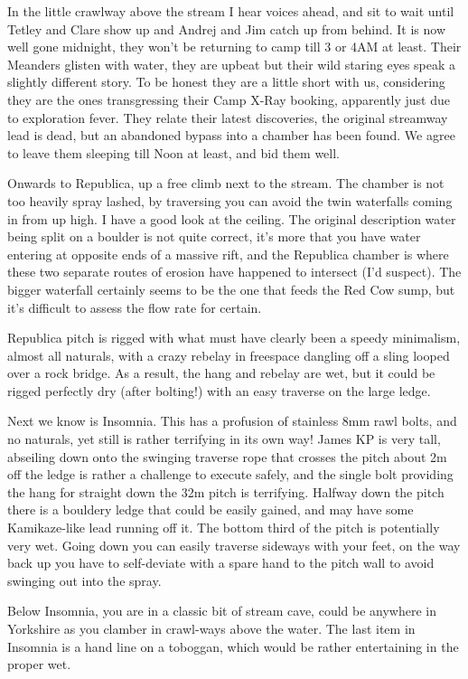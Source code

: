 In the little crawlway above the stream I hear voices ahead, and sit to
wait until Tetley and Clare show up and Andrej and Jim catch up from
behind. It is now well gone midnight, they won't be returning to camp
till 3 or 4AM at least. Their Meanders glisten with water, they are
upbeat but their wild staring eyes speak a slightly different story. To
be honest they are a little short with us, considering they are the ones
transgressing their Camp X-Ray booking, apparently just due to
exploration fever. They relate their latest discoveries, the original
streamway lead is dead, but an abandoned bypass into a chamber has been
found. We agree to leave them sleeping till Noon at least, and bid them
well.

Onwards to Republica, up a free climb next to the stream. The chamber is
not too heavily spray lashed, by traversing you can avoid the twin
waterfalls coming in from up high. I have a good look at the ceiling.
The original description water being split on a boulder is not quite
correct, it's more that you have water entering at opposite ends of a
massive rift, and the Republica chamber is where these two separate
routes of erosion have happened to intersect (I'd suspect). The bigger
waterfall certainly seems to be the one that feeds the Red Cow sump, but
it's difficult to assess the flow rate for certain.

Republica pitch is rigged with what must have clearly been a speedy
minimalism, almost all naturals, with a crazy rebelay in freespace
dangling off a sling looped over a rock bridge. As a result, the hang
and rebelay are wet, but it could be rigged perfectly dry (after
bolting!) with an easy traverse on the large ledge.

Next we know is Insomnia. This has a profusion of stainless 8mm rawl
bolts, and no naturals, yet still is rather terrifying in its own way!
James KP is very tall, abseiling down onto the swinging traverse rope
that crosses the pitch about 2m off the ledge is rather a challenge to
execute safely, and the single bolt providing the hang for straight down
the 32m pitch is terrifying. Halfway down the pitch there is a bouldery
ledge that could be easily gained, and may have some Kamikaze-like lead
running off it. The bottom third of the pitch is potentially very wet.
Going down you can easily traverse sideways with your feet, on the way
back up you have to self-deviate with a spare hand to the pitch wall to
avoid swinging out into the spray.

Below Insomnia, you are in a classic bit of stream cave, could be
anywhere in Yorkshire as you clamber in crawl-ways above the water. The
last item in Insomnia is a hand line on a toboggan, which would be
rather entertaining in the proper wet.

